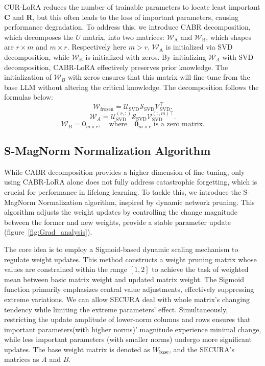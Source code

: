 CUR-LoRA reduces the number of trainable parameters to locate least important \( \boldsymbol{C} \) and \( \boldsymbol{R} \), but this often leads to the loss of important parameters, causing performance degradation. To address this, we introduce CABR decomposition, which decomposes the \( U \) matrix, into two matrices: \( \mathcal{W}_{\text{A}} \) and \( \mathcal{W}_{\text{B}} \), which shapes are \( r \times m \) and \( m \times r \). Respectively here \( m > r \). \( \mathcal{W}_{\text{A}} \) is initialized via SVD decomposition, while \( \mathcal{W}_{\text{B}} \) is initialized with zeros. By initializing \( \mathcal{W}_A \) with SVD decomposition, CABR-LoRA effectively preserves prior knowledge. The initialization of \( \mathcal{W}_B \) with zeros ensures that this matrix will fine-tune from the base LLM without altering the critical knowledge.
The decomposition follows the formulas below:
\begin{equation}
    \mathcal{W}_{\text{frozen}} = \mathcal{U}_{\text{SVD}} \mathcal{S}_{\text{SVD}} \mathcal{V}_{\text{SVD}}^{\top}.
\end{equation}
\begin{equation}
    \mathcal{W}_A = \mathcal{U}_{\text{SVD}}^{(r,:)} \mathcal{S}_{\text{SVD}} \mathcal{V}_{\text{SVD}}^{(:,m) \top}.
\end{equation}
\begin{equation}
    \mathcal{W}_B = \mathbf{0}_{m \times r}, \quad \text{where} \quad \mathbf{0}_{m \times r} \text{ is a zero matrix}.
\end{equation}

\subsection{S-MagNorm Normalization Algorithm}

While CABR decomposition provides a higher dimension of fine-tuning,  only using CABR-LoRA alone does not fully address catastrophic forgetting, which is crucial for performance in lifelong learning. To tackle this, we introduce the S-MagNorm Normalization algorithm, inspired by dynamic network pruning. This algorithm adjusts the weight updates by controlling the change magnitude between the former and new weights, provide a stable parameter update (figure~\ref{fig:Grad_analysis}).

The core idea is to employ a Sigmoid-based dynamic scaling mechanism to regulate weight updates. This method constructs a weight pruning matrix whose values are constrained within the range \([1,2]\) to achieve the task of weighted mean between basic matrix weight and updated matrix weight. The Sigmoid function primarily emphasizes central value adjustments, effectively suppressing extreme variations. We can allow SECURA deal with whole matrix's changing tendency while limiting the extreme parameters' effect. Simultaneously, restricting the update amplitude of lower-norm columns and rows ensures that important parameters(with higher norms)'  magnitude experience minimal change, while less important parameters (with smaller norms) undergo more significant updates. The base weight matrix is denoted as \( W_{\text{base}} \), and the SECURA's matrices as \( A \) and \( B \).

